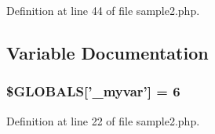 \-Definition at line 44 of file sample2.\-php.




\subsection{\-Variable \-Documentation}
\hypertarget{sample2_8php_af57fd0dc3f93457714d80dc8f32477a3}{
\subsubsection[{\$\-G\-L\-O\-B\-A\-L\-S}]{\setlength{\rightskip}{0pt plus 5cm}\$\-G\-L\-O\-B\-A\-L\-S\mbox{[}'\-\_\-myvar'\mbox{]} = 6}}\label{sample2_8php_af57fd0dc3f93457714d80dc8f32477a3}


\-Definition at line 22 of file sample2.\-php.

